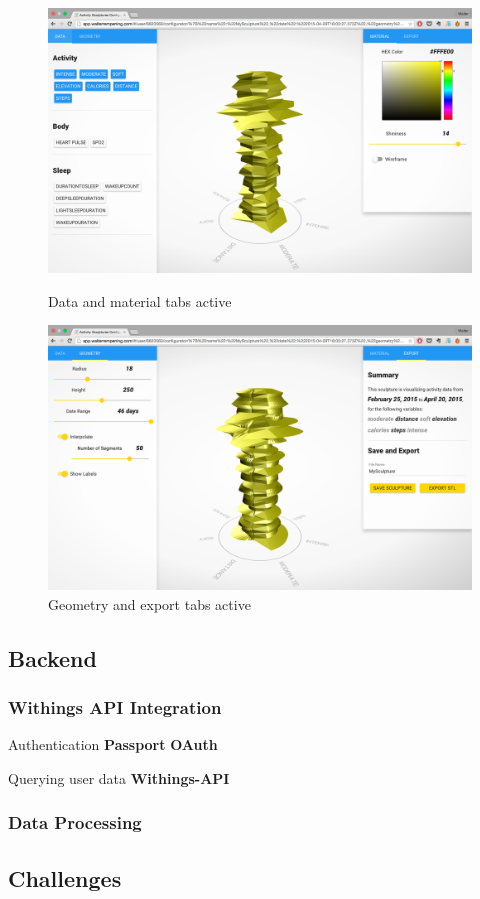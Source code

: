 \documentclass[../medieninformatik-arbeit.tex]{subfiles}
\begin{document}
\begin{figure}[h]
\centering
\begin{minipage}{0.45\textwidth}
\centering
	\includegraphics[width=\linewidth]{Configurator/img/configurator-ui_1}
	\caption{Data and material tabs active}
	\label{fig:configui1}
\end{minipage}
\begin{minipage}{0.45\textwidth}
\centering
  \includegraphics[width=\linewidth]{Configurator/img/configurator-ui_2}
  \caption{Geometry and export tabs active}
  \label{fig:configui2}
\end{minipage}
\end{figure}

\subsection{Backend}
\subsubsection{Withings API Integration}
\label{sub:ApiIntegration}

Authentication 
\textbf{Passport}\cite{passport} 
\textbf{OAuth} \cite{hammer2010oauth}

Querying user data
\textbf{Withings-API}\cite{withingsApi} 



\subsubsection{Data Processing}
\subsection{Challenges}
\end{document}
